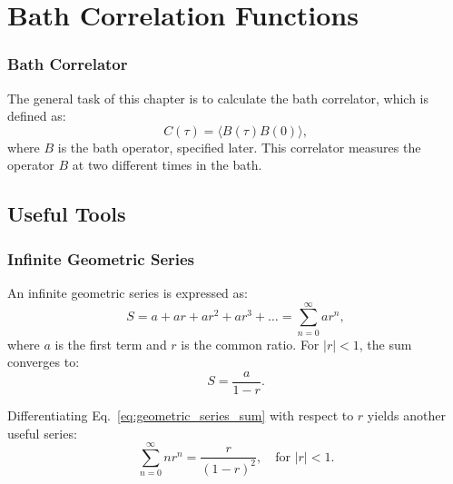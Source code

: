 
\chapter{Bath Correlation Functions} %

\label{Chapter_calc_extra_stuff} %


\subsection{Bath Correlator}
\label{subsec:bath_correlator}

The general task of this chapter is to calculate the bath correlator, which is defined as:
\begin{equation} \label{eq:bath_correlator}
C(\tau) = \langle B(\tau) B(0) \rangle,
\end{equation}
where \( B \) is the bath operator, specified later. This correlator measures the operator \( B \) at two different times in the bath.

\section{Useful Tools}

\subsection{Infinite Geometric Series}
An infinite geometric series is expressed as:
\begin{equation} \label{eq:infinite_geometric_series}
S = a + ar + ar^2 + ar^3 + \dots = \sum_{n=0}^{\infty} ar^n,
\end{equation}
where \(a\) is the first term and \(r\) is the common ratio. For \(|r| < 1\), the sum converges to:
\begin{equation} \label{eq:geometric_series_sum}
S = \frac{a}{1 - r}.
\end{equation}

Differentiating Eq.~\eqref{eq:geometric_series_sum} with respect to \( r \) yields another useful series:
\begin{equation} \label{eq:derivation_geometric_sum}
\sum_{n=0}^{\infty} n r^n = \frac{r}{(1-r)^2}, \quad \text{for } |r| < 1.
\end{equation}

